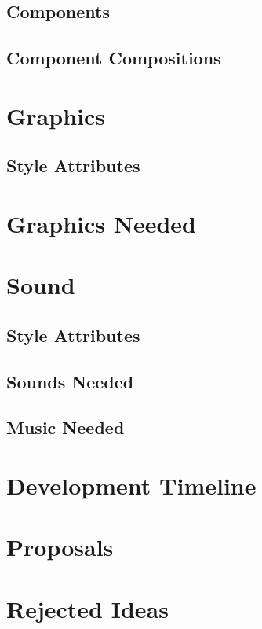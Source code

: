 \documentclass[letterpaper, twoside, 12pt]{memoir}
\begin{document}
\section{Components}
\section{Component Compositions}

\chapter{Graphics}
\section{Style Attributes}
\chapter{Graphics Needed}

\chapter{Sound}
\section{Style Attributes}
\section{Sounds Needed}
\section{Music Needed}

\chapter{Development Timeline}

\chapter{Proposals}

\chapter{Rejected Ideas}
\end{document}
